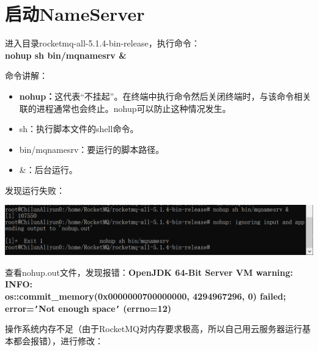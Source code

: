 \documentclass[11pt, a4paper, oneside, fontset=none]{ctexbook}
\begin{document}
\section{启动NameServer}
进入目录rocketmq-all-5.1.4-bin-release，执行命令：\\{\bfseries\kaishu nohup sh bin/mqnamesrv \&}

命令讲解：
\begin{itemize}
  \item {\bfseries\kaishu nohup：}这代表“不挂起”。在终端中执行命令然后关闭终端时，与该命令相关联的进程通常也会终止。nohup可以防止这种情况发生。
  \item sh：执行脚本文件的shell命令。
  \item bin/mqnamesrv：要运行的脚本路径。
  \item \&：后台运行。
\end{itemize}

发现运行失败：
\begin{center}
  \begin{minipage}{\textwidth}
    \center
    \includegraphics[width=\textwidth]{picture/名字服务器启动失败.png}
    \captionsetup{hypcap=false}
    \label{fig:名字服务器启动失败}
  \end{minipage}
\end{center}

查看nohup.out文件，发现报错：{\bfseries\kaishu OpenJDK 64-Bit Server VM warning: INFO: \\os::commit\_memory(0x0000000700000000, 4294967296, 0) failed; error=\texttt{'}Not enough space\texttt{'} (errno=12)}

操作系统内存不足（由于RocketMQ对内存要求极高，所以自己用云服务器运行基本都会报错），进行修改：
\end{document}

